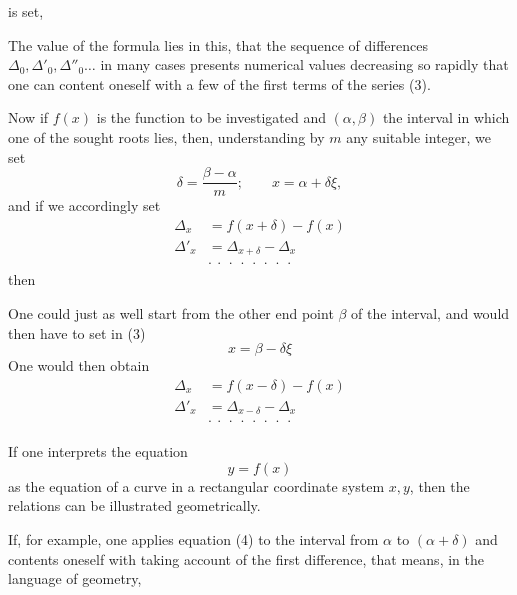 

is set,


The value of the formula lies in this, that the sequence of differences $\Delta_0, \Delta'_0, \Delta''_0 \ldots$ in many cases presents numerical values decreasing so rapidly that one can content oneself with a few of the first terms of the series (3).

Now if $f(x)$ is the function to be investigated and $(\alpha, \beta)$ the interval in which one of the sought roots lies, then, understanding by $m$ any suitable integer, we set
\[
\delta = \frac{\beta - \alpha}{m}; \qquad x = \alpha + \delta \xi,
\]
and if we accordingly set
\[
\begin{aligned}
\Delta_x &= f(x + \delta) - f(x) \\
\Delta'_x &= \Delta_{x+\delta} - \Delta_x \\
&\cdot\ \cdot\ \cdot\ \cdot\ \cdot\ \cdot\ \cdot\ \cdot
\end{aligned}
\]
then


One could just as well start from the other end point $\beta$ of the interval, and would then have to set in (3)
\[
x = \beta - \delta \xi
\]
One would then obtain
\[
\begin{aligned}
\Delta_x &= f(x - \delta) - f(x) \\
\Delta'_x &= \Delta_{x-\delta} - \Delta_x \\
&\cdot\ \cdot\ \cdot\ \cdot\ \cdot\ \cdot\ \cdot\ \cdot
\end{aligned}
\]


If one interprets the equation
\[
y = f(x)
\]
as the equation of a curve in a rectangular coordinate system $x, y$, then the relations can be illustrated geometrically.

If, for example, one applies equation (4) to the interval from $\alpha$ to $(\alpha + \delta)$ and contents oneself with taking account of the first difference, that means, in the language of geometry,
